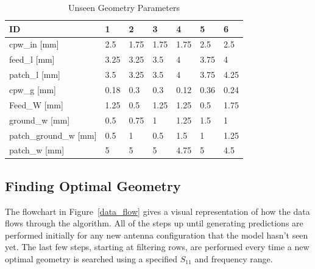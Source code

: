 \documentclass[conference]{IEEEtran}
\begin{document}
\begin{table}[h]
\caption{Unseen Geometry Parameters}
\begin{center}
\begin{tabular}{ |l|l|l|l|l|l|l| }
    \hline
    ID & 1 & 2 & 3 & 4 & 5 & 6 \\
    \hline
    cpw\_in [mm] & 2.5 & 1.75 & 1.75 & 1.75 & 2.5 & 2.5 \\
    \hline
    feed\_l [mm] & 3.25 & 3.25 & 3.5 & 4 & 3.75 & 4 \\
    \hline
    patch\_l [mm] & 3.5 & 3.25 & 3.5 & 4 & 3.75 & 4.25 \\
    \hline
    cpw\_g [mm] & 0.18 & 0.3 & 0.3 & 0.12 & 0.36 & 0.24 \\
    \hline
    Feed\_W [mm] & 1.25 & 0.5 & 1.25 & 1.25 & 0.5 & 1.75 \\
    \hline
    ground\_w [mm] & 0.5 & 0.75 & 1 & 1.25 & 1.5 & 1 \\
    \hline
    patch\_ground\_w [mm] & 0.5 & 1 & 0.5 & 1.5 & 1 & 1.25 \\
    \hline
    patch\_w [mm] & 5 & 5 & 5 & 4.75 & 5 & 4.5 \\
    \hline
\end{tabular}
\end{center}
\label{unseen_geometries_lw}
\end{table}    
    

\subsection{Finding Optimal Geometry}
The flowchart in Figure~\ref{data_flow} gives a visual representation of how the data flows through the algorithm. All of the steps up until generating predictions are performed initially for any new antenna configuration that the model hasn't seen yet. The last few steps, starting at filtering rows, are performed every time a new optimal geometry is searched using a specified $S_{11}$ and frequency range. 
\end{document}

